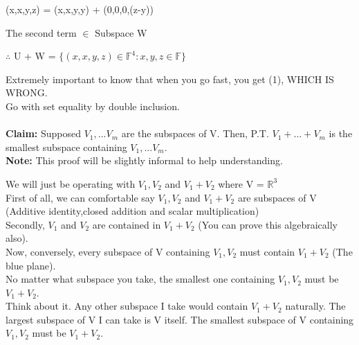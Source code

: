 \documentclass{article}
\begin{document}
\begin{center}
    (x,x,y,z) = (x,x,y,y) + (0,0,0,(z-y))
\end{center}
The second term $\in$ Subspace W 
\begin{center}
    $\therefore$ U + W = $\{(x,x,y,z) \in \mathbb{F}^4 : x,y,z \in \mathbb{F}\}$
\end{center}
Extremely important to know that when you go fast, you get (1), WHICH IS WRONG. \\
Go with set equality by double inclusion. \\
\\
\textbf{Claim:} Supposed $V_1,...V_m$ are the subspaces of V. Then, P.T. $V_1+...+V_m$ is the smallest subspace containing $V_1,...V_m$. \\
\textbf{Note:} This proof will be slightly informal to help understanding. \\
\begin{center}
\end{center}
We will just be operating with $V_1,V_2$ and $V_1+V_2$ where V = $\mathbb{R}^3$ \\
First of all, we can comfortable say $V_1,V_2$ and $V_1+V_2$ are subspaces of V (Additive identity,closed addition and scalar multiplication)\\
Secondly, $V_1$ and $V_2$ are contained in $V_1+V_2$ (You can prove this algebraically also). \\
Now, conversely, every subspace of V containing $V_1,V_2$ must contain $V_1+V_2$ (The blue plane). \\
No matter what subspace you take, the smallest one containing $V_1,V_2$ must be $V_1+V_2$. \\
Think about it. Any other subspace I take would contain $V_1+V_2$ naturally. The largest subspace of V I can take is V itself. The smallest subspace of V containing $V_1,V_2$ must be $V_1+V_2$. 
\end{document}
